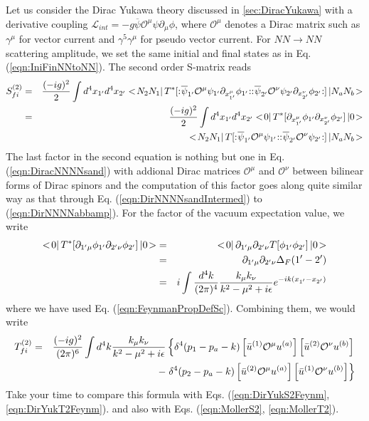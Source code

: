 Let us consider the Dirac Yukawa theory discussed in \ref{sec:DiracYukawa}
with a derivative coupling 
$\mathcal{L}_{int} = -g  \overline{\psi} \mathcal{O}^\mu \psi \partial_\mu \phi$,
where $\mathcal{O}^\mu$ denotes a Dirac matrix such as $\gamma^\mu$ for
vector current and $\gamma^5 \gamma^\mu$ for pseudo vector current.
For $NN \to NN$ scattering amplitude, we set the same initial and final states as
in Eq. (\ref{eqn:IniFinNNtoNN}).
The second order S-matrix reads
\begin{eqnarray}
S^{(2)}_{fi}
&=&
\frac{(-ig)^2}{2} \int d^4 x_{1'} d^4 x_{2'}
\bra N_2 N_1 \braend
T^*[
\normalprod{ \overline{\psi}_{1'} \mathcal{O}^\mu \psi_{1'} \partial_{x_{1'}^\mu}\phi_{1'}}
\normalprod{ \overline{\psi}_{2'} \mathcal{O}^\nu \psi_{2'} \partial_{x_{2'}^\nu}\phi_{2'}}
]
\ketend N_a N_b \ket
\nonumber\\
&=&
\frac{(-ig)^2}{2} \int d^4 x_{1'} d^4 x_{2'}
\bra 0 \braend T^*[
\partial_{x_{1'}^\mu}\phi_{1'}
\partial_{x_{2'}^\nu}\phi_{2'}
]
\ketend 0 \ket
\nonumber\\
&&
\hspace{30mm}
\bra N_2 N_1 \braend
T[
\normalprod{ \overline{\psi}_{1'} \mathcal{O}^\mu \psi_{1'} } 
\normalprod{ \overline{\psi}_{2'} \mathcal{O}^\nu \psi_{2'} }
]
\ketend N_a N_b \ket
\nonumber\\
\end{eqnarray}
The last factor in the second equation is 
nothing but one in Eq. (\ref{eqn:DiracNNNNsand})
with addional Dirac matrices $\mathcal{O}^\mu$ and $\mathcal{O}^\nu$ 
between bilinear forms of Dirac spinors and the computation of this factor
goes along quite similar way as that through 
Eq. (\ref{eqn:DirNNNNsandIntermed}) to (\ref{eqn:DirNNNNabbamp}).
For the factor of the vacuum expectation value, we write
\begin{eqnarray}
<\! 0 |\, T^*[
\partial_{1'\mu}\phi_{1'}
\partial_{2'\nu}\phi_{2'}
]
\,| 0 \!>
&=&
<\! 0 |\, 
\partial_{1'\mu}
\partial_{2'\nu}
T[
\phi_{1'}
\phi_{2'}
]
\,| 0 \!>
\nonumber\\
&=&
\partial_{1'\mu}
\partial_{2'\nu}
\Delta_F(1' - 2')
\nonumber\\
&=&
i \int
\frac{d^4 k}{(2\pi)^4}
\frac{k_\mu k_\nu}{k^2 - \mu^2 + i\epsilon}
e^{- ik (x_{1'} - x_{2'})}
\nonumber\\
\end{eqnarray}
where we have used Eq. (\ref{eqn:FeynmanPropDefSc}).
Combining them, we would write
\begin{eqnarray}
T^{(2)}_{fi}
&=&
\frac{(-ig)^2}{(2\pi)^6}
\int d^4 k
\frac{k_\mu k_\nu}{k^2 - \mu^2 + i\epsilon}
\left\{
\delta^4(p_1 - p_a - k)
\left[
\bar{u}^{(1)} \mathcal{O}^\mu u^{(a)} \right]
\left[ \bar{u}^{(2)} \mathcal{O}^\nu u^{(b)} \right]
\right.
\nonumber\\
&&
\hspace{35mm}
-
\left.
\delta^4(p_2 - p_a - k)
\left[
\bar{u}^{(2)} \mathcal{O}^\mu u^{(a)} \right]
\left[
 \bar{u}^{(1)} \mathcal{O}^\nu u^{(b)} \right]
\right\}
\nonumber\\
\end{eqnarray}
Take your time to compare this formula with Eqs. (\ref{eqn:DirYukS2Feynm}, \ref{eqn:DirYukT2Feynm}).
 and also with Eqs. (\ref{eqn:MollerS2}, \ref{eqn:MollerT2}).
